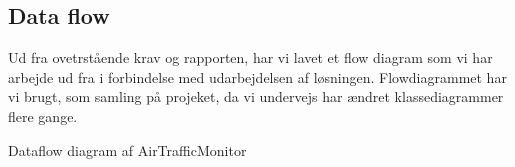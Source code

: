 
\newpage
\subsection{Data flow}
Ud fra ovetrstående krav og rapporten, har vi lavet et flow diagram som vi har arbejde ud fra i forbindelse med udarbejdelsen af løsningen. 
Flowdiagrammet har vi brugt, som samling på projeket, da vi undervejs har ændret klassediagrammer flere gange. 


 {Dataflow diagram af AirTrafficMonitor}